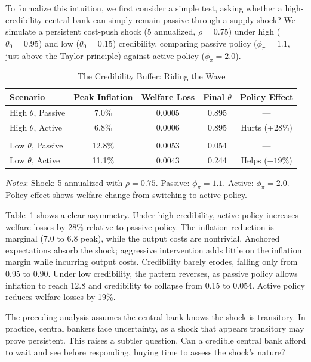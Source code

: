 \documentclass[10pt]{article}
\begin{document}
To formalize this intuition, we first consider a simple test, asking whether a high-credibility central bank can simply remain passive through a supply shock? We simulate a persistent cost-push shock (5 annualized, $\rho = 0.75$) under high ($\theta_0 = 0.95$) and low ($\theta_0 = 0.15$) credibility, comparing passive policy ($\phi_\pi = 1.1$, just above the Taylor principle) against active policy ($\phi_\pi = 2.0$).

\begin{table}[htbp]
\centering
\caption{The Credibility Buffer: Riding the Wave}
\label{tab:credibility_buffer}
\begin{tabular}{lcccc}
\toprule
Scenario & Peak Inflation & Welfare Loss & Final $\theta$ & Policy Effect
\\
\midrule
High $\theta$, Passive & 7.0\% & 0.0005 & 0.895 & --- \\
High $\theta$, Active & 6.8\% & 0.0006 & 0.895 & Hurts (+28\%) \\
\\[-0.5ex]
Low $\theta$, Passive & 12.8\% & 0.0053 & 0.054 & --- \\
Low $\theta$, Active & 11.1\% & 0.0043 & 0.244 & Helps ($-19\%$) \\
\bottomrule
\end{tabular}
\begin{tablenotes}
\small
\item \textit{Notes}: Shock: 5 annualized with $\rho = 0.75$. Passive: $\phi_\pi = 1.1$. Active: $\phi_\pi = 2.0$. Policy effect shows welfare change from switching to active policy.
\end{tablenotes}
\end{table}

Table~\ref{tab:credibility_buffer} shows a clear asymmetry. Under high credibility, active policy increases welfare losses by 28\% relative to passive policy. The inflation reduction is marginal (7.0 to 6.8 peak), while the output costs are nontrivial. Anchored expectations absorb the shock; aggressive intervention adds little on the inflation margin while incurring output costs. Credibility barely erodes, falling only from 0.95 to 0.90. Under low credibility, the pattern reverses, as passive policy allows inflation to reach 12.8 and credibility to collapse from 0.15 to 0.054. Active policy reduces welfare losses by 19\%.

The preceding analysis assumes the central bank knows the shock is transitory. In practice, central bankers face uncertainty, as a shock that appears transitory may prove persistent. This raises a subtler question. Can a credible central bank afford to wait and see before responding, buying time to assess the shock's nature?
\end{document}
